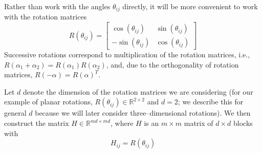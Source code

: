 \documentclass[11pt]{article}
\begin{document}
Rather than work with the angles $\theta_{ij}$ directly, it will be more convenient to work with the rotation matrices 
\begin{equation} \label{eq:R_theta}
R(\theta_{ij}) = \begin{bmatrix}
\cos(\theta_{ij}) & \sin(\theta_{ij}) \\
-\sin(\theta_{ij}) & \cos(\theta_{ij})
\end{bmatrix}
\end{equation}
%
Successive rotations correspond to multiplication of the rotation matrices, i.e., 
$R(\alpha_1 + \alpha_2) = R(\alpha_1) R(\alpha_2)$,
and, due to the orthogonality of rotation matrices, $R(-\alpha) = R(\alpha)^T$.

Let $d$ denote the dimension of the rotation matrices we are considering (for our example of planar rotations, $R(\theta_{ij}) \in \mathbb{R}^{2 \times 2}$ and $d=2$; we describe this for general $d$ because we will later consider three--dimensional rotations).
%
We then construct the matrix $H \in \mathbb{R}^{md \times md}$, where $H$ is an $m \times m$ matrix of $d \times d$ blocks with
\begin{equation} \label{eq:H_to_R}
H_{ij} = R(\theta_{ij})
\end{equation}
%
\end{document}
